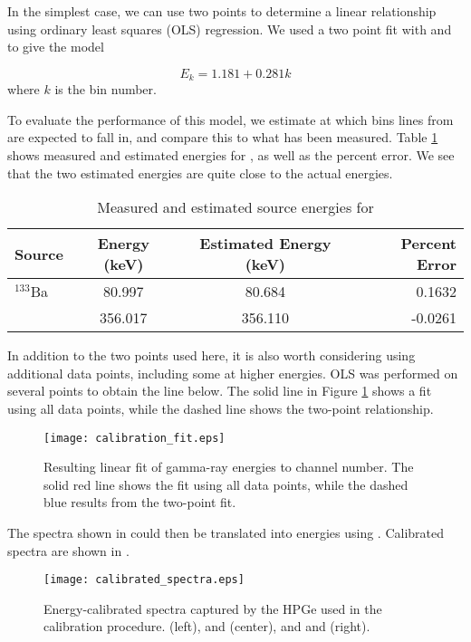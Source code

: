 In the simplest case, we can use two points to determine a linear relationship using ordinary least squares (OLS) regression.
We used a two point fit with  and  to give the model

\begin{equation}
\label{eq:cal}
E_k = 1.181 + 0.281k
\end{equation}
where $k$ is the bin number.


To evaluate the performance of this model, we estimate at which bins lines from  are expected to fall in, and compare this to what has been measured.
Table \ref{tab:barium} shows measured and estimated energies for , as well as the percent error.
We see that the two estimated energies are quite close to the actual energies.

\begin{table}
\renewcommand{\arraystretch}{1.3}
\caption{Measured and estimated source energies for }
\label{tab:barium}
\centering
\begin{tabular}{l|c|c|r}
\hline
\bfseries Source & \bfseries Energy (keV) & \bfseries Estimated Energy (keV) & \bfseries Percent Error\\
\hline\hline
      $^{133}$Ba    &  80.997    & 80.684   &  0.1632 \\
                    &  356.017   & 356.110  &  -0.0261 \\
\hline
\end{tabular}
\end{table}

In addition to the two points used here, it is also worth considering using additional data points, including some at higher energies.
OLS was performed on several points to obtain the line below.
The solid line in Figure \ref{fig:fit} shows a fit using all data points, while the dashed line shows the two-point relationship.

\begin{figure}
\centering
\texttt{[image: calibration\_fit.eps]}
\caption{Resulting linear fit of gamma-ray energies to channel number. The solid red line shows the fit using all data points, while the dashed blue results from the two-point fit.}
\label{fig:fit}
\end{figure}

The spectra shown in  could then be translated into energies using .
Calibrated spectra are shown in .
\begin{figure*}[t!]
\centering
\texttt{[image: calibrated\_spectra.eps]}
\caption{Energy-calibrated spectra captured by the HPGe used in the calibration procedure.  (left),  and  (center), and  and  (right).}
\label{fig:spectra_cal}
\end{figure*}
